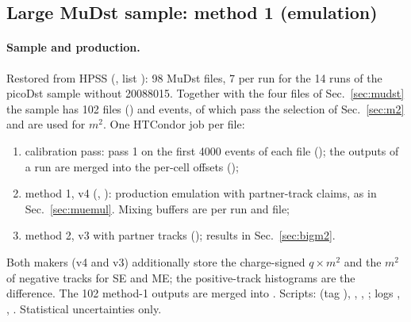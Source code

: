 \subsection{Large MuDst sample: method 1 (emulation)}
\label{sec:big}

\paragraph{Sample and production.} Restored from HPSS (, list
): 98 MuDst files, 7 per run for the 14 runs of the picoDst sample without 20088015.
Together with the four files of Sec.~\ref{sec:mudst} the sample has 102 files () and
\mubigEvAll{} events, of which \mubigEvMtwo{} pass the selection of Sec.~\ref{sec:m2} and are used for $m^2$. One HTCondor job
per file:
\begin{enumerate}
\item calibration pass:  pass 1 on the first 4000 events of each file
  (); the outputs of a run are merged into the per-cell offsets 
  ();
\item method 1,  v4 (, ): production emulation with
  partner-track claims, as in Sec.~\ref{sec:muemul}. Mixing buffers are per run and file;
\item method 2,  v3 with partner tracks (); results in
  Sec.~\ref{sec:bigm2}.
\end{enumerate}
Both makers (v4 and v3) additionally store the charge-signed $q\times m^2$ and the $m^2$ of negative tracks for SE and ME; the
positive-track histograms are the difference. The 102 method-1 outputs are merged into . Scripts:
 (tag ), , ,
; logs , ,
. Statistical uncertainties only.


